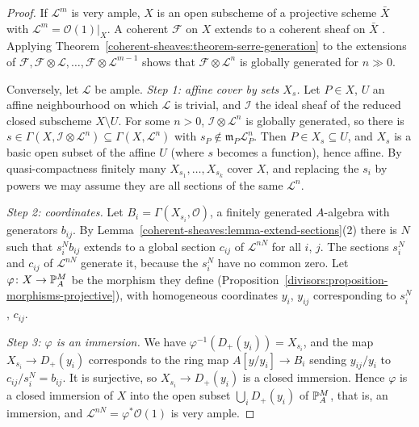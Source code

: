 \begin{proof}
If $\mathcal{L}^m$ is very ample, $X$ is an open subscheme of a projective scheme $\bar X$ with $\mathcal{L}^m = \mathcal{O}(1)|_X$. A coherent $\mathcal{F}$ on $X$ extends to a coherent sheaf
on $\bar X$ \cite[Exercise II.5.15]{hartshorne-ag}. Applying Theorem~\ref{coherent-sheaves:theorem-serre-generation} to the extensions of
$\mathcal{F}, \mathcal{F} \otimes \mathcal{L}, \ldots, \mathcal{F} \otimes \mathcal{L}^{m-1}$ shows that $\mathcal{F} \otimes \mathcal{L}^n$ is globally generated for $n \gg 0$.

Conversely, let $\mathcal{L}$ be ample. \emph{Step 1: affine cover by sets $X_s$.} Let $P \in X$, $U$ an affine neighbourhood on which $\mathcal{L}$ is trivial, and $\mathcal{I}$
the ideal sheaf of the reduced closed subscheme $X \setminus U$. For some $n > 0$, $\mathcal{I} \otimes \mathcal{L}^n$ is globally generated, so there is
$s \in \Gamma(X, \mathcal{I} \otimes \mathcal{L}^n) \subseteq \Gamma(X, \mathcal{L}^n)$ with $s_P \notin \mathfrak{m}_P\mathcal{L}^n_P$. Then $P \in X_s \subseteq U$, and $X_s$ is a basic
open subset of the affine $U$ (where $s$ becomes a function), hence affine. By quasi-compactness finitely many $X_{s_1}, \ldots, X_{s_k}$ cover $X$, and replacing
the $s_i$ by powers we may assume they are all sections of the same $\mathcal{L}^n$.

\emph{Step 2: coordinates.} Let $B_i = \Gamma(X_{s_i}, \mathcal{O})$, a finitely generated $A$-algebra with generators $b_{ij}$. By
Lemma~\ref{coherent-sheaves:lemma-extend-sections}(2) there is $N$ such that $s_i^Nb_{ij}$ extends to a global section $c_{ij}$ of $\mathcal{L}^{nN}$ for all $i$, $j$. The
sections $s_i^N$ and $c_{ij}$ of $\mathcal{L}^{nN}$ generate it, because the $s_i^N$ have no common zero. Let $\varphi \colon X \to \mathbb{P}^M_A$ be the morphism they define
(Proposition~\ref{divisors:proposition-morphisms-projective}), with homogeneous coordinates $y_i$, $y_{ij}$ corresponding to $s_i^N$, $c_{ij}$.

\emph{Step 3: $\varphi$ is an immersion.} We have $\varphi^{-1}(D_+(y_i)) = X_{s_i}$, and the map $X_{s_i} \to D_+(y_i)$ corresponds to the ring map
$A[y/y_i] \to B_i$ sending $y_{ij}/y_i$ to $c_{ij}/s_i^N = b_{ij}$. It is surjective, so $X_{s_i} \to D_+(y_i)$ is a closed immersion. Hence $\varphi$ is a closed
immersion of $X$ into the open subset $\bigcup_iD_+(y_i)$ of $\mathbb{P}^M_A$, that is, an immersion, and $\mathcal{L}^{nN} = \varphi^*\mathcal{O}(1)$ is very ample.
\end{proof}

